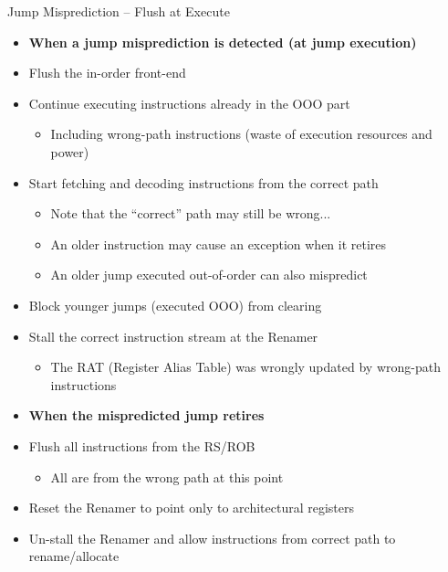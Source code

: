 \documentclass[aspectratio=169,12pt]{beamer}
\begin{document}
\begin{frame}{Jump Misprediction -- Flush at Execute}
    \begin{itemize}
        \item[] \textbf{When a jump misprediction is detected (at jump execution)}
        \item Flush the in-order front-end
        \item Continue executing instructions already in the OOO part
        \begin{itemize}
            \item Including wrong-path instructions (waste of execution resources and power)
        \end{itemize}
        \item Start fetching and decoding instructions from the correct path
        \begin{itemize}
            \item Note that the ``correct'' path may still be wrong...
            \item An older instruction may cause an exception when it retires
            \item An older jump executed out-of-order can also mispredict
        \end{itemize}
        \item Block younger jumps (executed OOO) from clearing
        \item Stall the correct instruction stream at the Renamer
        \begin{itemize}
            \item The RAT (Register Alias Table) was wrongly updated by wrong-path instructions
        \end{itemize}
        \vspace{0.5cm}
        \item[] \textbf{When the mispredicted jump retires}
        \item Flush all instructions from the RS/ROB
        \begin{itemize}
            \item All are from the wrong path at this point
        \end{itemize}
        \item Reset the Renamer to point only to architectural registers
        \item Un-stall the Renamer and allow instructions from correct path to rename/allocate
    \end{itemize}
\end{frame}
\end{document}
